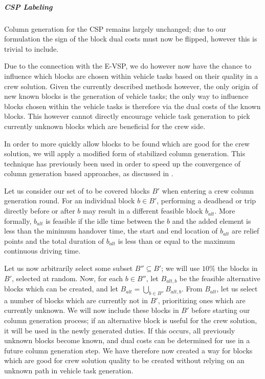 \documentclass[]{article}
\begin{document}
\subparagraph{CSP Labeling} Column generation for the CSP remains largely unchanged; due to our formulation the sign of the block dual costs must now be flipped, however this is trivial to include. 

Due to the connection with the E-VSP, we do however now have the chance to influence which blocks are chosen within vehicle tasks based on their quality in a crew solution. Given the currently described methods however, the only origin of new known blocks is the generation of vehicle tasks; the only way to influence blocks chosen within the vehicle tasks is therefore via the dual costs of the known blocks. This however cannot directly encourage vehicle task generation to pick currently unknown blocks which are beneficial for the crew side. 

In order to more quickly allow blocks to be found which are good for the crew solution, we will apply a modified form of stabilized column generation. This technique has previously been used in order to speed up the convergence of column generation based approaches, as discussed in \citet{DuMerle1999}. 

Let us consider our set of to be covered blocks $B'$ when entering a crew column generation round. For an individual block $b \in B'$, performing a deadhead or trip directly before or after $b$ may result in a different feasible block $b_{alt}$. More formally, $b_{alt}$ is feasible if the idle time between the $b$ and the added element is less than the minimum handover time, the start and end location of $b_{alt}$ are relief points and the total duration of $b_{alt}$ is less than or equal to the maximum continuous driving time.

Let us now arbitrarily select some subset $B'' \subseteq B'$; we will use $10\%$ the blocks in $B'$, selected at random. Now, for each $b \in B''$, let $B_{alt,b}$ be the feasible alternative blocks which can be created, and let $B_{alt} = \bigcup_{b \in B''} B_{alt,b}$. From $B_{alt}$, let us select a number of blocks which are currently not in $B'$, prioritizing ones which are currently unknown. We will now include these blocks in $B'$ before starting our column generation process; if an alternative block is useful for the crew solution, it will be used in the newly generated duties. If this occurs, all previously unknown blocks become known, and dual costs can be determined for use in a future column  generation step. We have therefore now created a way for blocks which are good for crew solution quality to be created without relying on an unknown path in vehicle task generation.
\end{document}
